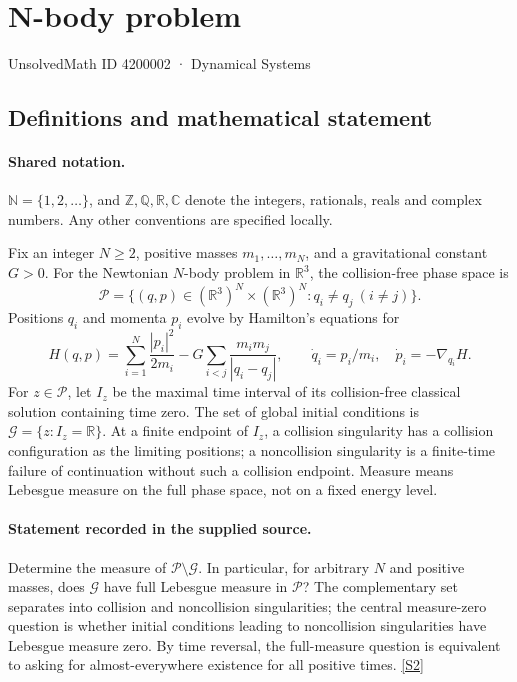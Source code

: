 \documentclass[11pt]{article}
\newcommand{\sref}[2]{\hyperlink{source:#1:#2}{[S#2]}}
\begin{document}
\setcounter{section}{4200001}
\section{N-body problem}\label{4200002}
{\small\sffamily UnsolvedMath ID 4200002 · Dynamical Systems}
\subsection{Definitions and mathematical statement}

\paragraph{Shared notation.}$\mathbb N=\{1,2,\ldots\}$, and $\mathbb Z,\mathbb Q,\mathbb R,\mathbb C$ denote the integers, rationals, reals and complex numbers. Any other conventions are specified locally.


Fix an integer \(N\ge2\), positive masses \(m_1,\ldots,m_N\), and a gravitational constant \(G>0\). For the Newtonian \(N\)-body problem in \(\mathbb R^3\), the collision-free phase space is
\[\mathcal P=\{(q,p)\in(\mathbb R^3)^N\times(\mathbb R^3)^N:q_i\ne q_j\ (i\ne j)\}.\]
Positions \(q_i\) and momenta \(p_i\) evolve by Hamilton's equations for
\[H(q,p)=\sum_{i=1}^N\frac{|p_i|^2}{2m_i}
-G\sum_{i<j}\frac{m_i m_j}{|q_i-q_j|},\qquad
\dot q_i=p_i/m_i,\quad \dot p_i=-\nabla_{q_i}H.\]
For \(z\in\mathcal P\), let \(I_z\) be the maximal time interval of its collision-free classical solution containing time zero. The set of global initial conditions is \(\mathcal G=\{z:I_z=\mathbb R\}\). At a finite endpoint of \(I_z\), a collision singularity has a collision configuration as the limiting positions; a noncollision singularity is a finite-time failure of continuation without such a collision endpoint. Measure means Lebesgue measure on the full phase space, not on a fixed energy level.
\paragraph{Statement recorded in the supplied source.}
Determine the measure of \(\mathcal P\setminus\mathcal G\). In particular, for arbitrary \(N\) and positive masses, does \(\mathcal G\) have full Lebesgue measure in \(\mathcal P\)? The complementary set separates into collision and noncollision singularities; the central measure-zero question is whether initial conditions leading to noncollision singularities have Lebesgue measure zero. By time reversal, the full-measure question is equivalent to asking for almost-everywhere existence for all positive times. \sref{4200002}{2}
\end{document}
